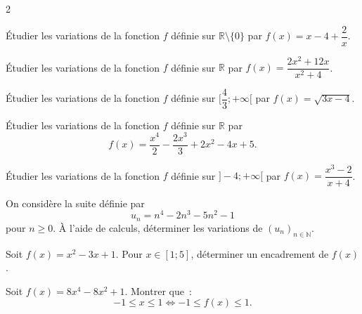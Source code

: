 \documentclass[a4paper,12pt]{article}
\begin{document}
\begin{multicols}{2}
\begin{exercice}[title=Exercice 14 $\quad \star \quad$ { [Calculer] }]{}{}
Étudier les variations de la fonction $f$ définie sur $\mathbb{R} \setminus \{0\}$ par $f(x) = x - 4 + \dfrac{2}{x}$.
\end{exercice}

\begin{exercice}[title=Exercice 15 $\quad \star \quad$ { [Calculer] }]{}{}
Étudier les variations de la fonction $f$ définie sur $\mathbb{R}$ par $f(x) = \dfrac{2x^2 + 12x}{x^2 + 4}$.
\end{exercice}

\begin{exercice}[title=Exercice 16 $\quad \star \quad$ { [Calculer] }]{}{}
Étudier les variations de la fonction $f$ définie sur $[\dfrac{4}{3}; +\infty[$ par $f(x) = \sqrt{3x-4}$.
\end{exercice}

\begin{exercice}[title=Exercice 17 $\quad \star \star \star \quad$ { [Calculer] }]{}{}
Étudier les variations de la fonction $f$ définie sur $\mathbb{R}$ par $$f(x) = \dfrac{x^4}{2} - \dfrac{2x^3}{3} + 2x^2 - 4x + 5.$$
\end{exercice}

\begin{exercice}[title=Exercice 18 $\quad \star \star \quad$ { [Calculer] }]{}{}
Étudier les variations de la fonction $f$ définie sur $]-4; +\infty[$ par $f(x) = \dfrac{x^3 - 2}{x + 4}$.
\end{exercice}

\vfill

\begin{exercice}[title=Exercice 19 $\quad \star \star \quad$ { [Calculer] }]{}{}
On considère la suite définie par $$u_n = n^4 - 2n^3 - 5n^2 - 1$$ pour $n \geq 0$. À l'aide de calculs, déterminer les variations de $(u_n)_{n \in \mathbb{N}}$.
\end{exercice}

\vfill

\begin{exercice}[title=Exercice 20 $\quad \star \star \quad$ { [Calculer] }]{}{}
Soit $f(x) = x^2 - 3x + 1$. Pour $x \in [1; 5]$, déterminer un encadrement de $f(x)$.
\end{exercice}

\vfill

\begin{exercice}[title=Exercice 21 $\quad \star \star \quad$ { [Calculer, Raisonner] }]{}{}
Soit $f(x) = 8x^4 - 8x^2 + 1$. Montrer que :
\[
-1 \leq x \leq 1 \iff -1 \leq f(x) \leq 1.
\]
\end{exercice}


\end{multicols}
\end{document}
